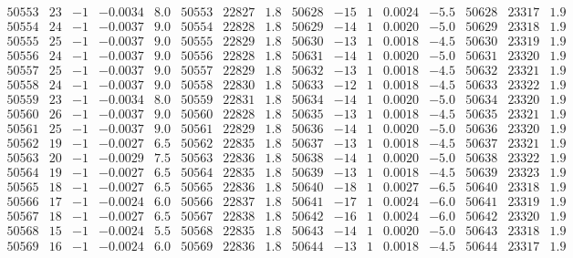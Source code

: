 \documentclass[11pt,reqno,a4letter]{article}
\numberwithin{figure}{section}
\numberwithin{table}{section}
\theoremstyle{plain}
\numberwithin{theorem}{section}
\theoremstyle{definition}
\begin{document}
\begin{table}[ht]
\begin{equation*}
{\begin{array}{ccccc|ccc||ccccc|ccc}
50553 & 23 & -1 & -0.0034 & 8.0 & 50553 & 22827 & 1.8 & 50628 & -15 & 1 & 0.0024 & -5.5 & 50628 & 23317 & 1.9  \\
50554 & 24 & -1 & -0.0037 & 9.0 & 50554 & 22828 & 1.8 & 50629 & -14 & 1 & 0.0020 & -5.0 & 50629 & 23318 & 1.9  \\
50555 & 25 & -1 & -0.0037 & 9.0 & 50555 & 22829 & 1.8 & 50630 & -13 & 1 & 0.0018 & -4.5 & 50630 & 23319 & 1.9  \\
50556 & 24 & -1 & -0.0037 & 9.0 & 50556 & 22828 & 1.8 & 50631 & -14 & 1 & 0.0020 & -5.0 & 50631 & 23320 & 1.9  \\
50557 & 25 & -1 & -0.0037 & 9.0 & 50557 & 22829 & 1.8 & 50632 & -13 & 1 & 0.0018 & -4.5 & 50632 & 23321 & 1.9  \\
50558 & 24 & -1 & -0.0037 & 9.0 & 50558 & 22830 & 1.8 & 50633 & -12 & 1 & 0.0018 & -4.5 & 50633 & 23322 & 1.9  \\
50559 & 23 & -1 & -0.0034 & 8.0 & 50559 & 22831 & 1.8 & 50634 & -14 & 1 & 0.0020 & -5.0 & 50634 & 23320 & 1.9  \\
50560 & 26 & -1 & -0.0037 & 9.0 & 50560 & 22828 & 1.8 & 50635 & -13 & 1 & 0.0018 & -4.5 & 50635 & 23321 & 1.9  \\
50561 & 25 & -1 & -0.0037 & 9.0 & 50561 & 22829 & 1.8 & 50636 & -14 & 1 & 0.0020 & -5.0 & 50636 & 23320 & 1.9  \\
50562 & 19 & -1 & -0.0027 & 6.5 & 50562 & 22835 & 1.8 & 50637 & -13 & 1 & 0.0018 & -4.5 & 50637 & 23321 & 1.9  \\
50563 & 20 & -1 & -0.0029 & 7.5 & 50563 & 22836 & 1.8 & 50638 & -14 & 1 & 0.0020 & -5.0 & 50638 & 23322 & 1.9  \\
50564 & 19 & -1 & -0.0027 & 6.5 & 50564 & 22835 & 1.8 & 50639 & -13 & 1 & 0.0018 & -4.5 & 50639 & 23323 & 1.9  \\
50565 & 18 & -1 & -0.0027 & 6.5 & 50565 & 22836 & 1.8 & 50640 & -18 & 1 & 0.0027 & -6.5 & 50640 & 23318 & 1.9  \\
50566 & 17 & -1 & -0.0024 & 6.0 & 50566 & 22837 & 1.8 & 50641 & -17 & 1 & 0.0024 & -6.0 & 50641 & 23319 & 1.9  \\
50567 & 18 & -1 & -0.0027 & 6.5 & 50567 & 22838 & 1.8 & 50642 & -16 & 1 & 0.0024 & -6.0 & 50642 & 23320 & 1.9  \\
50568 & 15 & -1 & -0.0024 & 5.5 & 50568 & 22835 & 1.8 & 50643 & -14 & 1 & 0.0020 & -5.0 & 50643 & 23318 & 1.9  \\
50569 & 16 & -1 & -0.0024 & 6.0 & 50569 & 22836 & 1.8 & 50644 & -13 & 1 & 0.0018 & -4.5 & 50644 & 23317 & 1.9  \\

\end{array}}
\end{equation*}
\end{table}
\end{document}
